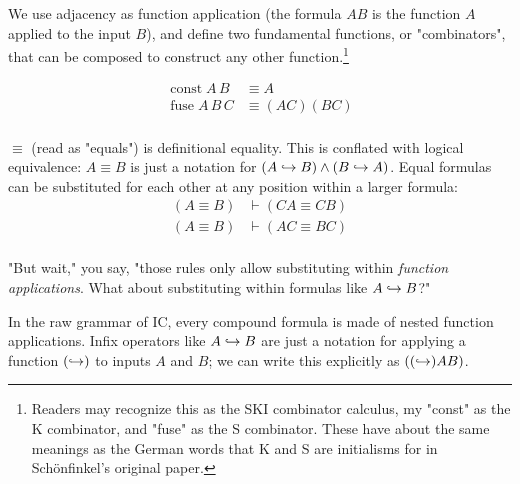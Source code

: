 \documentclass{article}
\begin{document}
  We use adjacency as function application (the formula $AB$ is the function $A$ applied to the input $B$), and define two fundamental functions, or "combinators", that can be composed to construct any other function.\footnote{Readers may recognize this as the SKI combinator calculus, my "const" as the K combinator, and "fuse" as the S combinator. These have about the same meanings as the German words that K and S are initialisms for in Schönfinkel's original paper.}
  
  \newcommand{\id}{\operatorname{\mathrm{id}}}
  \newcommand{\const}{\operatorname{\mathrm{const}}}
  \newcommand{\fuse}{\operatorname{\mathrm{fuse}}}
  \begin{align*}
    \const A\,B &\equiv A\\
    \fuse A\,B\,C &\equiv (AC)(BC)\\
  \end{align*}
  
  $\equiv$ (read as "equals") is definitional equality.
  This is conflated with logical equivalence: $A \equiv B$ is just a notation for $(A \hookrightarrow B) \wedge (B \hookrightarrow A)$. Equal formulas can be substituted for each other at any position within a larger formula:
  \begin{align*}
    (A \equiv B) &\vdash (CA \equiv CB)\\
    (A \equiv B) &\vdash (AC \equiv BC)\\
  \end{align*}
  
  "But wait," you say, "those rules only allow substituting within \emph{function applications}. What about substituting within formulas like $A \hookrightarrow B$?"
  
  In the raw grammar of IC, every compound formula is made of nested function applications. Infix operators like $A \hookrightarrow B$ are just a notation for applying a function $(\hookrightarrow)$ to inputs $A$ and $B$; we can write this explicitly as $((\hookrightarrow) A B)$.
  
  
  
  
  
\end{document}
